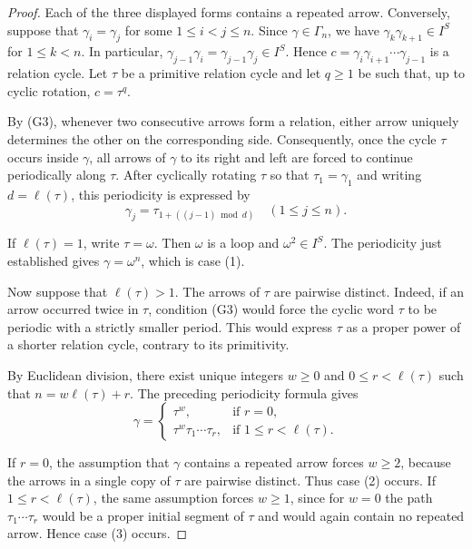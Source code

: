 \documentclass[11pt,a4paper,reqno]{amsart}
\theoremstyle{plain}
\theoremstyle{definition}
\numberwithin{equation}{section}
\begin{document}
	\begin{proof}
		Each of the three displayed forms contains a repeated arrow. Conversely, suppose that $\gamma_i=\gamma_j$ for some $1\leq i<j\leq n$. Since $\gamma\in\Gamma_n$, we have $\gamma_k\gamma_{k+1}\in I^S$ for $1\leq k<n$. In particular,
		$\gamma_{j-1}\gamma_i=\gamma_{j-1}\gamma_j\in I^S$. Hence
		$c=\gamma_i\gamma_{i+1}\cdots\gamma_{j-1}$
		is a relation cycle. Let $\tau$ be a primitive relation cycle and let $q\geq1$ be such that, up to cyclic rotation, $c=\tau^q$.
		
		By \textup{(G3)}, whenever two consecutive arrows form a relation, either
		arrow uniquely determines the other on the corresponding side. Consequently,
		once the cycle $\tau$ occurs inside $\gamma$, all arrows of $\gamma$ to its
		right and left are forced to continue periodically along $\tau$. After
		cyclically rotating $\tau$ so that $\tau_1=\gamma_1$ and writing
		$d=\ell(\tau)$, this periodicity is expressed by
		\[
		\gamma_j=\tau_{1+((j-1)\bmod d)}
		\quad(1\leq j\leq n).
		\]
		
		
		If $\ell(\tau)=1$, write $\tau=\omega$. Then $\omega$ is a loop and $\omega^2\in I^S$. The periodicity just established gives
		$\gamma=\omega^n$,
		which is case \textup{(1)}.
		
		Now suppose that $\ell(\tau)>1$. The arrows of $\tau$ are pairwise
		distinct. Indeed, if an arrow occurred twice in $\tau$, condition
		\textup{(G3)} would force the cyclic word $\tau$ to be periodic with a
		strictly smaller period. This would express $\tau$ as a proper power of a
		shorter relation cycle, contrary to its primitivity.
		
		By Euclidean division, there exist unique integers $w\geq0$ and $0\leq r<\ell(\tau)$ such that
		$n=w\ell(\tau)+r$. The preceding periodicity formula gives
		\[
		\gamma=
		\begin{cases}
			\tau^w, & \text{if } r=0,\\
			\tau^w\tau_1\cdots\tau_r, & \text{if } 1\leq r<\ell(\tau).
		\end{cases}
		\]
		
		If $r=0$, the assumption that $\gamma$ contains a repeated arrow forces $w\geq2$, because the arrows in a single copy of $\tau$ are pairwise distinct. Thus case \textup{(2)} occurs. If $1\leq r<\ell(\tau)$, the same assumption forces $w\geq1$, since for $w=0$ the path $\tau_1\cdots\tau_r$ would be a proper initial segment of $\tau$ and would again contain no repeated arrow. Hence case \textup{(3)} occurs.
	\end{proof}
	
\end{document}
